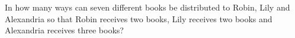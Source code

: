 In how many ways can seven different books be distributed to Robin, Lily and Alexandria so that Robin receives two books, Lily receives two books and Alexandria receives three books?

